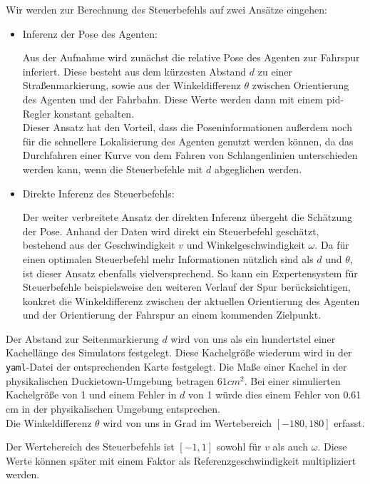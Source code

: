 Wir werden zur Berechnung des Steuerbefehls auf zwei Ansätze eingehen:

\begin{itemize}
	\item Inferenz der Pose des Agenten: \\ 
	\vspace{-0.6cm}
	
	Aus der Aufnahme wird zunächst die relative Pose des Agenten zur Fahrspur inferiert. Diese besteht aus dem kürzesten Abstand $d$ zu einer Straßenmarkierung, sowie aus der Winkeldifferenz $\theta$ zwischen Orientierung des Agenten und der Fahrbahn. Diese Werte werden dann mit einem \acs{pid}-Regler konstant gehalten.\\
	Dieser Ansatz hat den Vorteil, dass die Poseninformationen außerdem noch für die schnellere Lokalisierung des Agenten genutzt werden können, da das Durchfahren einer Kurve von dem Fahren von Schlangenlinien unterschieden werden kann, wenn die Steuerbefehle mit $d$ abgeglichen werden.
	
	\item Direkte Inferenz des Steuerbefehls: \\ 
	\vspace{-0.6cm}
	
	Der weiter verbreitete Ansatz der direkten Inferenz übergeht die Schätzung der Pose. Anhand der Daten wird direkt ein Steuerbefehl geschätzt, bestehend aus der Geschwindigkeit $v$ und Winkelgeschwindigkeit $\omega$. Da für einen optimalen Steuerbefehl mehr Informationen nützlich sind als $d$ und $\theta$, ist dieser Ansatz ebenfalls vielversprechend. So kann ein Expertensystem für Steuerbefehle beispielsweise den weiteren Verlauf der Spur berücksichtigen, konkret die Winkeldifferenz zwischen der aktuellen Orientierung des Agenten und der Orientierung der Fahrspur an einem kommenden Zielpunkt.
\end{itemize}

\newpage

Der Abstand zur Seitenmarkierung $d$ wird von uns als ein hundertstel einer Kachellänge des Simulators festgelegt. Diese Kachelgröße wiederum wird in der \texttt{yaml}-Datei der entsprechenden Karte festgelegt. Die Maße einer Kachel in der physikalischen Duckietown-Umgebung betragen $61 cm^2$. Bei einer simulierten Kachelgröße von 1 und einem Fehler in $d$ von 1 würde dies einem Fehler von 0.61 cm in der physikalischen Umgebung entsprechen. \\

Die Winkeldifferenz $\theta$ wird von uns in Grad im Wertebereich $[-180, 180]$ erfasst. 

Der Wertebereich des Steuerbefehls ist $[-1, 1]$ sowohl für $v$ als auch $\omega$. Diese Werte können später mit einem Faktor als Referenzgeschwindigkeit multipliziert werden.